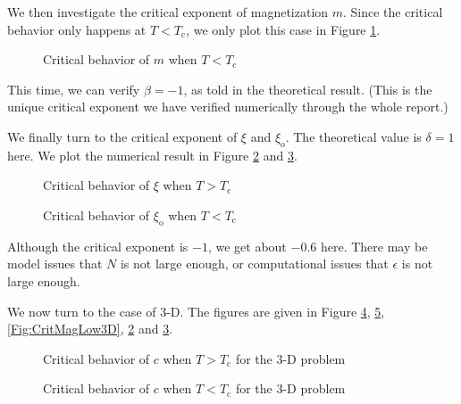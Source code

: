 \documentclass[english, nochinese]{pnote}
\begin{document}
We then investigate the critical exponent of magnetization $m$. Since the critical behavior only happens at $ T < T_{\text{c}} $, we only plot this case in Figure \ref{Fig:CritMagLow}.

\begin{figure}[htbp]
\centering
\scalebox{0.725}{}
\caption{Critical behavior of $m$ when $ T < T_{\text{c}}$}
\label{Fig:CritMagLow}
\end{figure}

This time, we can verify $ \beta = -1 $, as told in the theoretical result. (This is the unique critical exponent we have verified numerically through the whole report.)

We finally turn to the critical exponent of $\xi$ and $\xi_{\text{o}}$. The theoretical value is $ \delta = 1 $ here. We plot the numerical result in Figure \ref{Fig:CritXiHigh} and \ref{Fig:CritXiLow}.

\begin{figure}[htbp]
\centering

\caption{Critical behavior of $\xi$ when $ T > T_{\text{c}}$}
\label{Fig:CritXiHigh}
\end{figure}

\begin{figure}[htbp]
\centering

\caption{Critical behavior of $\xi_{\text{o}}$ when $ T < T_{\text{c}}$}
\label{Fig:CritXiLow}
\end{figure}

Although the critical exponent is $-1$, we get about $-0.6$ here. There may be model issues that $N$ is not large enough, or computational issues that $\epsilon$ is not large enough.

We now turn to the case of 3-D. The figures are given in Figure \ref{Fig:CritAlphaHigh3D}, \ref{Fig:CritAlphaLow3D}, \ref{Fig:CritMagLow3D}, \ref{Fig:CritXiHigh} and \ref{Fig:CritXiLow}.

\begin{figure}[htbp]
\centering
\scalebox{0.725}{}
\caption{Critical behavior of $c$ when $ T > T_{\text{c}}$ for the 3-D problem}
\label{Fig:CritAlphaHigh3D}
\end{figure}

\begin{figure}[htbp]
\centering
\scalebox{0.725}{}
\caption{Critical behavior of $c$ when $ T < T_{\text{c}}$ for the 3-D problem}
\label{Fig:CritAlphaLow3D}
\end{figure}
\end{document}
